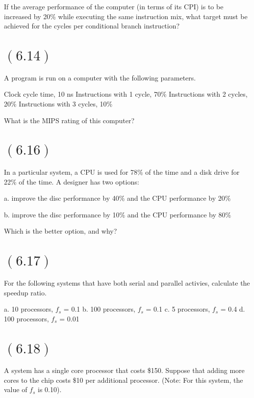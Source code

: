 \documentclass[letterpaper,12pt,titlepage]{article}
\begin{document}
If the average performance of the computer (in terms of its CPI) is to be increased by 20\% while executing the same instruction mix, what target must be achieved for the cycles per conditional branch instruction?

\begin{mdframed}[style=MyFrame]
\end{mdframed}

\section*{$(6.14)$} A program is run on a computer with the following parameters.

Clock cycle time, 10 ns
Instructions with 1 cycle, 70\%
Instructions with 2 cycles, 20\%
Instructions with 3 cycles, 10\%

What is the MIPS rating of this computer?

\begin{mdframed}[style=MyFrame]
\end{mdframed}

\section*{$(6.16)$} In a particular system, a CPU is used for 78\% of the time and a disk drive for 22\% of the time. A designer has two options:

a. improve the disc performance by 40\% and the CPU performance by 20\%

b. improve the disc performance by 10\% and the CPU performance by 80\%

Which is the better option, and why?

\begin{mdframed}[style=MyFrame]
\end{mdframed}

\section*{$(6.17)$} For the following systems that have both serial and parallel activies, calculate the speedup ratio.

a. 10 processors, $f_s$ = 0.1
b. 100 processors, $f_s$ = 0.1
c. 5 processors, $f_s$ = 0.4
d. 100 processors, $f_s$ = 0.01

\begin{mdframed}[style=MyFrame]
\end{mdframed}

\section*{$(6.18)$} A system has a single core processor that costs \$150. Suppose that adding more cores to the chip costs \$10 per additional processor. (Note: For this system, the value of $f_s$ is 0.10).
\end{document}
